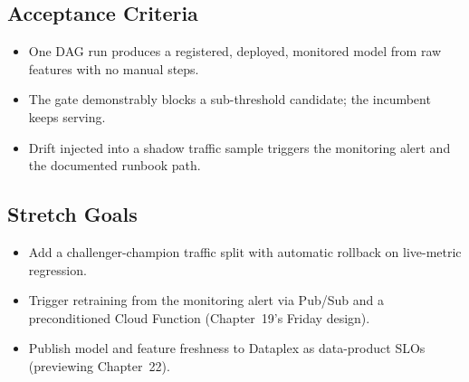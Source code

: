 \subsection*{Acceptance Criteria}
\begin{itemize}
    \item One DAG run produces a registered, deployed, monitored model from raw features with no manual steps.
    \item The gate demonstrably blocks a sub-threshold candidate; the incumbent keeps serving.
    \item Drift injected into a shadow traffic sample triggers the monitoring alert and the documented runbook path.
\end{itemize}

\subsection*{Stretch Goals}
\begin{itemize}
    \item Add a challenger-champion traffic split with automatic rollback on live-metric regression.
    \item Trigger retraining from the monitoring alert via Pub/Sub and a preconditioned Cloud Function (Chapter~19's Friday design).
    \item Publish model and feature freshness to Dataplex as data-product SLOs (previewing Chapter~22).
\end{itemize}
